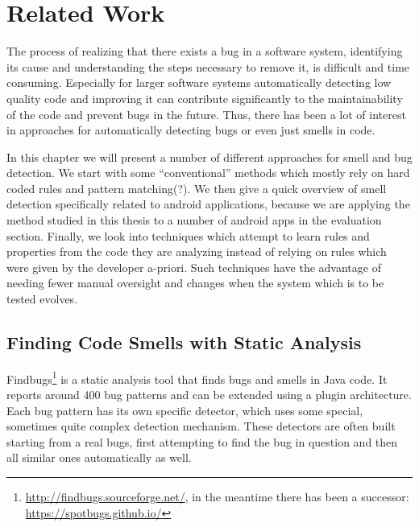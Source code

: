\chapter{Related Work}\label{ch:relWork}


The process of realizing that there exists a bug in a software system, identifying its cause and understanding the steps necessary to remove it, is difficult and time consuming.
Especially for larger software systems automatically detecting low quality code and improving it can contribute significantly to the maintainability of the code and prevent bugs in the future.
Thus, there has been a lot of interest in approaches for automatically detecting bugs or even just smells in code.

In this chapter we will present a number of different approaches for smell and bug detection.
We start with some ``conventional'' methods which mostly rely on hard coded rules and pattern matching(?).
We then give a quick overview of smell detection specifically related to android applications, because we are applying the method studied in this thesis to a number of android apps in the evaluation section.
Finally, we look into techniques which attempt to learn rules and properties from the code they are analyzing instead of relying on rules which were given by the developer a-priori.
Such techniques have the advantage of needing fewer manual oversight and changes when the system which is to be tested evolves.

\section{Finding Code Smells with Static Analysis}

Findbugs\footnote{\url{http://findbugs.sourceforge.net/}, in the meantime there has been a successor: \url{https://spotbugs.github.io/}} is a static analysis tool that finds bugs and smells in Java code.
It reports around 400 bug patterns and can be extended using a plugin architecture.
Each bug pattern has its own specific detector, which uses some special, sometimes quite complex detection mechanism.
These detectors are often built starting from a real bugs, first attempting to find the bug in question and then all similar ones automatically as well.

